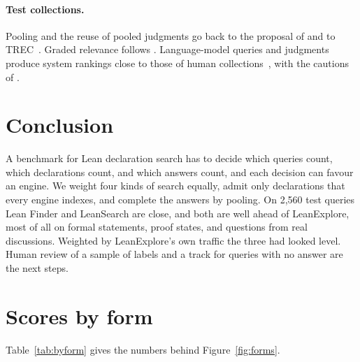 \documentclass{article}
\begin{document}
\paragraph{Test collections.} Pooling and the reuse of pooled judgments go
back to the proposal of \citet{sparckjones1975pooling} and to
TREC~\cite{voorhees2005trec}. Graded relevance follows
\citet{jarvelin2002cumulated}. Language-model queries and judgments produce
system rankings close to those of human
collections~\cite{rahmani2024synthetic,thomas2024llm}, with the cautions of
\citet{faggioli2023perspectives}.

\section{Conclusion}

A benchmark for Lean declaration search has to decide which queries count,
which declarations count, and which answers count, and each decision can
favour an engine. We weight four kinds of search equally, admit only
declarations that every engine indexes, and complete the answers by pooling.
On 2,560 test queries Lean Finder and LeanSearch are close, and both are well
ahead of LeanExplore, most of all on formal statements, proof states, and
questions from real discussions. Weighted by LeanExplore's own traffic the
three had looked level. Human review of a sample of labels and a track for
queries with no answer are the next steps.

{\small


}

\clearpage
\appendix

\section{Scores by form}
\label{app:forms}

Table~\ref{tab:byform} gives the numbers behind Figure~\ref{fig:forms}.
\end{document}
